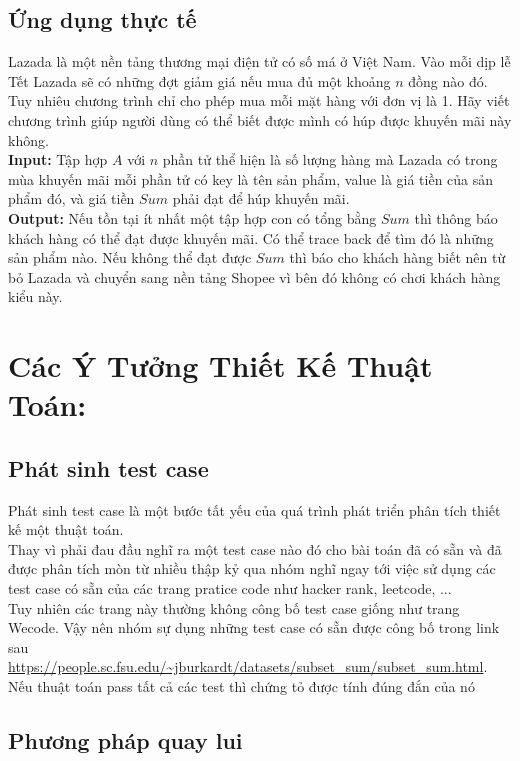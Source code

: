 \documentclass[a4paper]{article}
\begin{document}
\subsection{Ứng dụng thực tế}
Lazada là một nền tảng thương mại điện tử có số má ở Việt Nam. Vào mỗi dịp lễ Tết Lazada sẽ có những đợt giảm giá nếu mua đủ một khoảng $n$ đồng nào đó. Tuy nhiêu chương trình chỉ cho phép mua mỗi mặt hàng với đơn vị là 1. Hãy viết chương trình giúp người dùng có thể biết được mình có húp được khuyến mãi này không. \medskip \\
\textbf{Input:} Tập hợp $A$ với $n$ phần tử thể hiện là số lượng hàng mà Lazada có trong mùa khuyến mãi mỗi phần tử có key là tên sản phẩm, value là giá tiền của sản phẩm đó, và giá tiền $Sum$ phải đạt để húp khuyến mãi.  \medskip \\
\textbf{Output:} Nếu tồn tại ít nhất một tập hợp con có tổng bằng $Sum$ thì thông báo khách hàng có thể đạt được khuyến mãi. Có thể trace back để tìm đó là những sản phẩm nào. Nếu không thể đạt được $Sum$ thì báo cho khách hàng biết nên từ bỏ Lazada và chuyển sang nền tảng Shopee vì bên đó không có chơi khách hàng kiểu này. 
\newpage

\section{Các Ý Tưởng Thiết Kế Thuật Toán:}
\subsection{Phát sinh test case}
Phát sinh test case là một bước tất yếu của quá trình phát triển phân tích thiết kế một thuật toán. \\
Thay vì phải đau đầu nghĩ ra một test case nào đó cho bài toán đã có sẵn và đã được phân tích mòn từ nhiều thập kỷ qua nhóm nghĩ ngay tới việc sử dụng các test case có sẵn của các trang pratice code như hacker rank, leetcode, ... \\
Tuy nhiên các trang này thường không công bố test case giống như trang Wecode. Vậy nên nhóm sự dụng những test case có sẵn được công bố trong link sau \url{https://people.sc.fsu.edu/~jburkardt/datasets/subset_sum/subset_sum.html}.\\ Nếu thuật toán pass tất cả các test thì chứng tỏ được tính đúng đắn của nó \\
\subsection{Phương pháp quay lui }
\end{document}
